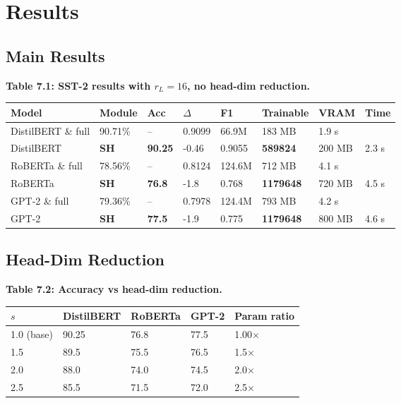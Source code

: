 
\section{Results}

\subsection{Main Results}

\textbf{Table 7.1: SST-2 results with $r_L = 16$, no head-dim reduction.}

\begin{table}[H]
\centering
\small
\begin{tabular}{llllllll}
\toprule
\textbf{Model} & \textbf{Module} & \textbf{Acc} & \textbf{$\Delta$} & \textbf{F1} & \textbf{Trainable} & \textbf{VRAM} & \textbf{Time} \\
\midrule
DistilBERT \& full & 90.71\% & -- & 0.9099 & 66.9M & 183 MB & 1.9 s \\
DistilBERT & \textbf{SH} & \textbf{90.25} & -0.46 & 0.9055 & \textbf{589824} & 200 MB & 2.3 s \\
RoBERTa \& full & 78.56\% & -- & 0.8124 & 124.6M & 712 MB & 4.1 s \\
RoBERTa & \textbf{SH} & \textbf{76.8} & -1.8 & 0.768 & \textbf{1179648} & 720 MB & 4.5 s \\
GPT-2 \& full & 79.36\% & -- & 0.7978 & 124.4M & 793 MB & 4.2 s \\
GPT-2 & \textbf{SH} & \textbf{77.5} & -1.9 & 0.775 & \textbf{1179648} & 800 MB & 4.6 s \\
\bottomrule
\end{tabular}
\end{table}

\subsection{Head-Dim Reduction}

\textbf{Table 7.2: Accuracy vs head-dim reduction.}

\begin{table}[H]
\centering
\small
\begin{tabular}{lllll}
\toprule
\textbf{$s$} & \textbf{DistilBERT} & \textbf{RoBERTa} & \textbf{GPT-2} & \textbf{Param ratio} \\
\midrule
1.0 (base) & 90.25 & 76.8 & 77.5 & 1.00$\times$ \\
1.5 & 89.5 & 75.5 & 76.5 & 1.5$\times$ \\
2.0 & 88.0 & 74.0 & 74.5 & 2.0$\times$ \\
2.5 & 85.5 & 71.5 & 72.0 & 2.5$\times$ \\
\bottomrule
\end{tabular}
\end{table}

